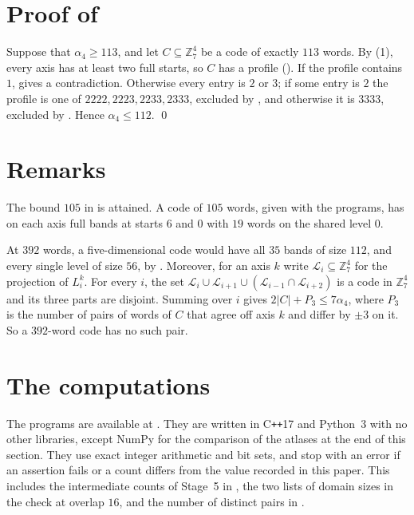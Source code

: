 \documentclass[11pt,colorlinks]{charlie}
\newcommand{\Zs}{\mathbb{Z}_7}
\newcommand{\cL}{\mathcal{L}}
\begin{document}
\section{Proof of \texorpdfstring{}{the main theorem}}\label{sec:proof}
Suppose that $\alpha_4\ge113$, and let $C\subseteq\Zs^4$ be a code of exactly $113$ words. By (1), every axis has at least two full starts, so $C$ has a profile (). If the profile contains $1$,  gives a contradiction. Otherwise every entry is $2$ or $3$; if some entry is $2$ the profile is one of $2222,2223,2233,2333$, excluded by , and otherwise it is $3333$, excluded by . Hence $\alpha_4\le112$. \qed

\section{Remarks}\label{sec:remarks}
\begin{remark}\label{rem:105}
The bound $105$ in  is attained. A code of $105$ words, given with the programs, has on each axis full bands at starts $6$ and $0$ with $19$ words on the shared level $0$.
\end{remark}

\begin{remark}
At $392$ words, a five-dimensional code would have all $35$ bands of size $112$, and every single level of size $56$, by . Moreover, for an axis $k$ write $\cL_i\subseteq\Zs^4$ for the projection of $L^k_i$. For every $i$, the set $\cL_i\cup\cL_{i+1}\cup(\cL_{i-1}\cap\cL_{i+2})$ is a code in $\Zs^4$ and its three parts are disjoint. Summing over $i$ gives $2|C|+P_3\le7\alpha_4$, where $P_3$ is the number of pairs of words of $C$ that agree off axis $k$ and differ by $\pm3$ on it. So a $392$-word code has no such pair.
\end{remark}

\section{The computations}\label{sec:computation}
The programs are available at \coderepo. They are written in C\texttt{++}17 and Python~3 with no other libraries, except NumPy for the comparison of the atlases at the end of this section. They use exact integer arithmetic and bit sets, and stop with an error if an assertion fails or a count differs from the value recorded in this paper. This includes the intermediate counts of Stage~5 in , the two lists of domain sizes in the check at overlap $16$, and the number of distinct pairs in .
\end{document}
